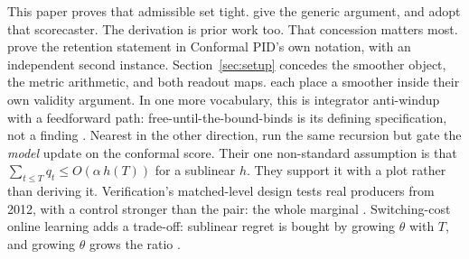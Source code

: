 This paper proves that admissible set tight. \citet[Appendix~A]{dupuy2026relevance} give
the generic argument, and \citet{duerst2024calibrating} adopt that scorecaster. The derivation is
prior work too. That concession matters most. \citet[Corollary~2]{li2025o2cp} prove the
retention statement in Conformal PID's own notation, with \citet{wang2026acmcp} an independent
second instance. Section~\ref{sec:setup} concedes the smoother object, the metric arithmetic, and
both readout maps. \citet{zheng2025scdsplit,wu2025eci,chen2023ipoc,lade2026bcaci} each place a
smoother inside their own validity argument. In one more vocabulary, this is integrator anti-windup
with a feedforward path: free-until-the-bound-binds is its defining specification, not a finding
\citep{galeani2009antiwindup}. Nearest in the other direction, \citet{gao2025coloke} run the same
recursion but gate the \emph{model} update on the conformal score. Their one non-standard
assumption is that $\sum_{t \le T} q_t \le O(\alpha\,h(T))$ for a sublinear $h$. They support it
with a plot rather than deriving it. Verification's matched-level design tests real producers from
2012, with a control stronger than the pair: the whole marginal
\citep{pinson2012scenarios,worsnop2018scenarios}. Switching-cost online learning adds a trade-off:
sublinear regret is bought by growing $\theta$ with $T$, and growing $\theta$ grows the ratio
\citep[Thm.~7]{andrew2013twometrics}.

